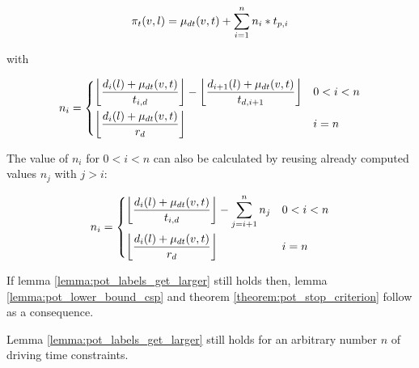 \begin{align*}
	\pi_t(v,l) = \drivingtime(v,t) + \sum_{i=1}^n{ n_i * t_{p,i}}
\end{align*}

with

\begin{align*}
	n_i =\begin{dcases}
		\floor*{ \frac{d_{i}(l) + \drivingtime(v,t)}{t_{i,d}} } - \floor*{ \frac{d_{i+1}(l) + \drivingtime(v,t)}{t_{d,i+1}} } & 0 < i < n \\
		\floor*{ \frac{d_{i}(l) + \drivingtime(v,t)}{\restr_d} }                                                              & i=n
	\end{dcases}
\end{align*}

The value of $n_i$ for $0 < i < n$ can also be calculated by reusing already computed values $n_j$ with $j > i$:

\begin{align*}
	n_i =\begin{dcases}
		\floor*{ \frac{d_{i}(l) + \drivingtime(v,t)}{t_{i,d}} } - \sum_{j=i+1}^{n}{n_{j} } & 0 < i < n \\
		\floor*{ \frac{d_{i}(l) + \drivingtime(v,t)}{\restr_d} }                           & i=n
	\end{dcases}
\end{align*}

If lemma \ref{lemma:pot_labels_get_larger} still holds then, lemma \ref{lemma:pot_lower_bound_csp} and theorem \ref{theorem:pot_stop_criterion} follow as a consequence.

\begin{lemma}
	Lemma \ref{lemma:pot_labels_get_larger} still holds for an arbitrary number $n$ of driving time constraints.
\end{lemma}

